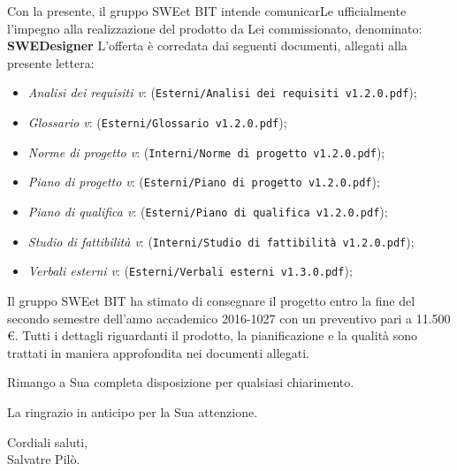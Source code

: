 \vspace{5mm}Con la presente, il gruppo SWEet BIT intende comunicarLe ufficialmente l'impegno
	alla realizzazione del prodotto da Lei commissionato, denominato: {\textbf{SWEDesigner}} \newline
	L'offerta è corredata dai seguenti documenti, allegati alla presente lettera:
	\begin{itemize}
		\item \emph{Analisi dei requisiti v\VersioneAR{}}: (\verb|Esterni/Analisi dei requisiti v1.2.0.pdf|);
		\item \emph{Glossario v\VersioneG{}}: (\verb|Esterni/Glossario v1.2.0.pdf|);
		\item \emph{Norme di progetto v\VersioneNP{}}: (\verb|Interni/Norme di progetto v1.2.0.pdf|);
		\item \emph{Piano di progetto v\VersionePP{}}: (\verb|Esterni/Piano di progetto v1.2.0.pdf|);
		\item \emph{Piano di qualifica v\VersionePQ{}}: (\verb|Esterni/Piano di qualifica v1.2.0.pdf|);
		\item \emph{Studio di fattibilità v\VersioneSF{}}: (\verb|Interni/Studio di fattibilità v1.2.0.pdf|);
		\item \emph{Verbali esterni v\VersioneVE{}}: (\verb|Esterni/Verbali esterni v1.3.0.pdf|);
	\end{itemize}
	Il gruppo SWEet BIT ha stimato di consegnare il progetto entro la fine del secondo semestre dell'anno accademico 2016-1027
	con un preventivo pari a 11.500 \euro .
	Tutti i dettagli riguardanti il prodotto, la pianificazione e la qualità sono trattati in maniera approfondita
	nei documenti allegati.
	\begin{flushleft}
	\vspace{2cm}
		Rimango a Sua completa disposizione per qualsiasi chiarimento.
	\end{flushleft}
	\begin{flushleft}
		La ringrazio in anticipo per la Sua attenzione.
	\end{flushleft}
	\vspace{5mm}
	\begin{center}
		Cordiali saluti,\\
		\vspace{1cm}Salvatre Pilò.
	\end{center}

